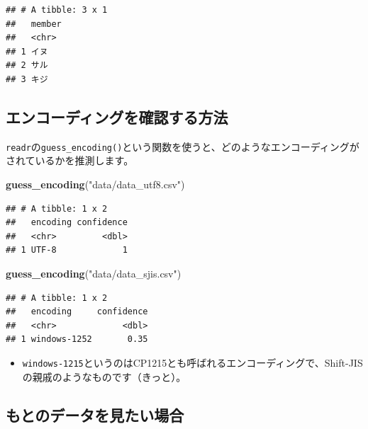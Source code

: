 \documentclass[]{bxjsreport}
\newenvironment{Shaded}{\begin{snugshade}}{\end{snugshade}}
\newcommand{\KeywordTok}[1]{\textcolor[rgb]{0.13,0.29,0.53}{\textbf{#1}}}
\newcommand{\NormalTok}[1]{#1}
\newcommand{\StringTok}[1]{\textcolor[rgb]{0.31,0.60,0.02}{#1}}
\providecommand{\tightlist}{%
  \setlength{\itemsep}{0pt}\setlength{\parskip}{0pt}}
\let\asdf\section
\renewcommand{\section}{\chapter}
\let\asdff\subsection
\renewcommand{\subsection}{\asdf}
\renewcommand{\subsubsection}{\asdff}
\begin{document}
\begin{verbatim}
## # A tibble: 3 x 1
##   member
##   <chr> 
## 1 イヌ  
## 2 サル  
## 3 キジ
\end{verbatim}

\hypertarget{ux30a8ux30f3ux30b3ux30fcux30c7ux30a3ux30f3ux30b0ux3092ux78baux8a8dux3059ux308bux65b9ux6cd5}{%
\subsubsection{エンコーディングを確認する方法}\label{ux30a8ux30f3ux30b3ux30fcux30c7ux30a3ux30f3ux30b0ux3092ux78baux8a8dux3059ux308bux65b9ux6cd5}}

\texttt{readr}の\texttt{guess\_encoding()}という関数を使うと、どのようなエンコーディングがされているかを推測します。

\begin{Shaded}
\begin{Highlighting}[]
\KeywordTok{guess_encoding}\NormalTok{(}\StringTok{"data/data_utf8.csv"}\NormalTok{)}
\end{Highlighting}
\end{Shaded}

\begin{verbatim}
## # A tibble: 1 x 2
##   encoding confidence
##   <chr>         <dbl>
## 1 UTF-8             1
\end{verbatim}

\begin{Shaded}
\begin{Highlighting}[]
\KeywordTok{guess_encoding}\NormalTok{(}\StringTok{"data/data_sjis.csv"}\NormalTok{)}
\end{Highlighting}
\end{Shaded}

\begin{verbatim}
## # A tibble: 1 x 2
##   encoding     confidence
##   <chr>             <dbl>
## 1 windows-1252       0.35
\end{verbatim}

\begin{itemize}
\tightlist
\item
  \texttt{windows-1215}というのはCP1215とも呼ばれるエンコーディングで、Shift-JISの親戚のようなものです（きっと）。
\end{itemize}

\hypertarget{ux3082ux3068ux306eux30c7ux30fcux30bfux3092ux898bux305fux3044ux5834ux5408}{%
\subsubsection{もとのデータを見たい場合}\label{ux3082ux3068ux306eux30c7ux30fcux30bfux3092ux898bux305fux3044ux5834ux5408}}
\end{document}
